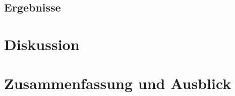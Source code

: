 \documentclass[11pt,a4paper,twoside]{article}
\begin{document}
\hypertarget{ergebnisse}{%
\subsection{Ergebnisse}\label{ergebnisse}}

\cleardoublepage

\hypertarget{diskussion}{%
\section{Diskussion}\label{diskussion}}

\cleardoublepage

\hypertarget{zusammenfassung-und-ausblick}{%
\section{Zusammenfassung und
Ausblick}\label{zusammenfassung-und-ausblick}}

\printbibliography
\end{document}
